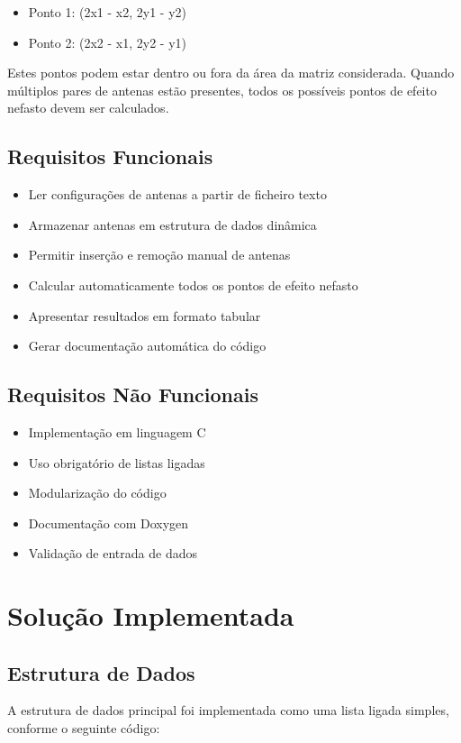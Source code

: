 \documentclass[a4paper,12pt]{article}
\begin{document}
\begin{itemize}
    \item Ponto 1: (2x1 - x2, 2y1 - y2)
    \item Ponto 2: (2x2 - x1, 2y2 - y1)
\end{itemize}

Estes pontos podem estar dentro ou fora da área da matriz considerada. Quando múltiplos pares de antenas estão presentes, todos os possíveis pontos de efeito nefasto devem ser calculados.

\subsection{Requisitos Funcionais}
\begin{itemize}
    \item Ler configurações de antenas a partir de ficheiro texto
    \item Armazenar antenas em estrutura de dados dinâmica
    \item Permitir inserção e remoção manual de antenas
    \item Calcular automaticamente todos os pontos de efeito nefasto
    \item Apresentar resultados em formato tabular
    \item Gerar documentação automática do código
\end{itemize}

\subsection{Requisitos Não Funcionais}
\begin{itemize}
    \item Implementação em linguagem C
    \item Uso obrigatório de listas ligadas
    \item Modularização do código
    \item Documentação com Doxygen
    \item Validação de entrada de dados
\end{itemize}

\section{Solução Implementada}
\label{sec:solucao}

\subsection{Estrutura de Dados}
A estrutura de dados principal foi implementada como uma lista ligada simples, conforme o seguinte código:
\end{document}
